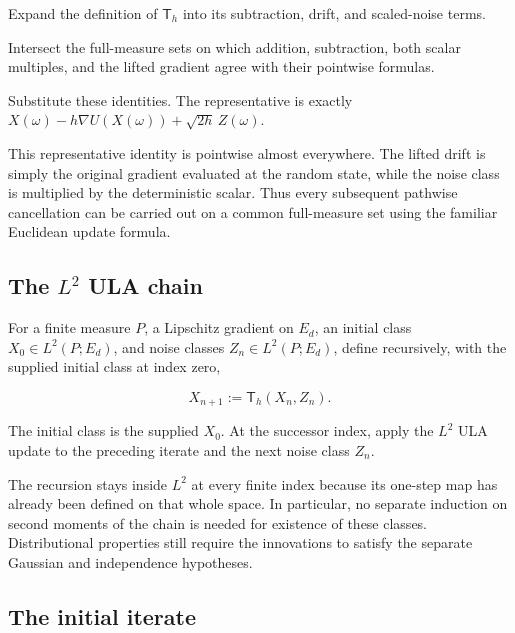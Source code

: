 \documentclass[11pt,a4paper]{report}
\begin{document}
Expand the definition of \(\mathsf T_h\) into its subtraction, drift, and scaled-noise terms.



Intersect the full-measure sets on which addition, subtraction, both scalar multiples, and the lifted gradient agree with their pointwise formulas.



Substitute these identities. The representative is exactly \(X(\omega)-h\nabla U(X(\omega))+\sqrt{2h}\,Z(\omega)\).



This representative identity is pointwise almost everywhere. The lifted drift is simply the original gradient evaluated at the random state, while the noise class is multiplied by the deterministic scalar. Thus every subsequent pathwise cancellation can be carried out on a common full-measure set using the familiar Euclidean update formula.

\subsection{\texorpdfstring{The \(L^2\) ULA chain}{The L² ULA chain}}
\label{report-step-UnadjustedLangevin-LpDrift-lean-13}


For a finite measure \(P\), a Lipschitz gradient on \(E_d\), an initial class \(X_0\in L^2(P;E_d)\), and noise classes \(Z_n\in L^2(P;E_d)\), define recursively, with the supplied initial class at index zero,

\[X_{n+1}:=\mathsf T_h(X_n,Z_n).\]

The initial class is the supplied \(X_0\). At the successor index, apply the \(L^2\) ULA update to the preceding iterate and the next noise class \(Z_n\).



The recursion stays inside \(L^2\) at every finite index because its one-step map has already been defined on that whole space. In particular, no separate induction on second moments of the chain is needed for existence of these classes. Distributional properties still require the innovations to satisfy the separate Gaussian and independence hypotheses.

\subsection{\texorpdfstring{The initial iterate}{The initial iterate}}
\label{report-step-UnadjustedLangevin-LpDrift-lean-14}
\end{document}
